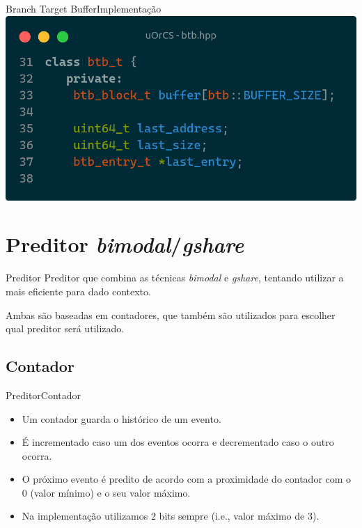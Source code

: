 \documentclass{beamer}
\begin{document}
\begin{frame}{Branch Target Buffer}{Implementação}
	\includegraphics[width=\textwidth]{btb.png}
\end{frame}

\section{Preditor \textit{bimodal}/\textit{gshare}}

\begin{frame}{Preditor}
	Preditor que combina as técnicas \textit{bimodal} e \textit{gshare}, tentando
	utilizar a mais eficiente para dado contexto.

	\vfill

	Ambas são baseadas em contadores, que também são utilizados para escolher qual
	preditor será utilizado.

\end{frame}

\subsection{Contador}

\begin{frame}{Preditor}{Contador}
	\begin{itemize}
		\item Um contador guarda o histórico de um evento.
		\item É incrementado caso um dos eventos ocorra e decrementado caso o outro
		      ocorra.
		\item O próximo evento é predito de acordo com a proximidade do contador com
		      o 0 (valor mínimo) e o seu valor máximo.
		\item Na implementação utilizamos 2 bits sempre (i.e., valor máximo de 3).
	\end{itemize}
\end{frame}
\end{document}
